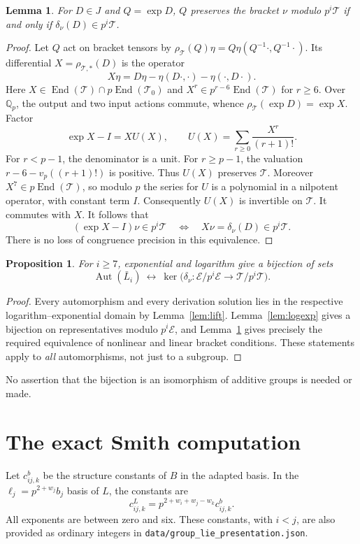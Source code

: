 \documentclass[11pt]{article}
\newtheorem{lemma}[theorem]{Lemma}
\newtheorem{proposition}[theorem]{Proposition}
\theoremstyle{definition}\newtheorem{definition}[theorem]{Definition}
\theoremstyle{remark}\newtheorem{remark}[theorem]{Remark}
\DeclareMathOperator{\Aut}{Aut}
\DeclareMathOperator{\End}{End}
\newcommand{\Qp}{\mathbb Q_p}
\newcommand{\EE}{\mathcal E}
\newcommand{\TT}{\mathcal T}
\begin{document}
\begin{lemma}\label{lem:tensor}
For $D\in J$ and $Q=\exp D$, $Q$ preserves the bracket $\nu$ modulo
$p^i\TT$ if and only if $\delta_\nu(D)\in p^i\TT$.
\end{lemma}
\begin{proof}
Let $Q$ act on bracket tensors by
$\rho_\TT(Q)\eta=Q\eta(Q^{-1}\cdot,Q^{-1}\cdot)$.
Its differential $X=\rho_{\TT,*}(D)$ is the operator
\[
 X\eta=D\eta-\eta(D\cdot,\cdot)-\eta(\cdot,D\cdot).
\]
Here $X\in\End(\TT)\cap p\End(\TT_0)$ and
$X^r\in p^{r-6}\End(\TT)$ for $r\ge6$.
Over $\Qp$, the output and two input actions commute, whence
$\rho_\TT(\exp D)=\exp X$.
Factor
\[
 \exp X-I=XU(X),\qquad
 U(X)=\sum_{r\ge0}\frac{X^r}{(r+1)!}.
\]
For $r<p-1$, the denominator is a unit. For $r\ge p-1$, the valuation
$r-6-v_p((r+1)!)$ is positive. Thus $U(X)$ preserves $\TT$.
Moreover $X^7\in p\End(\TT)$, so modulo $p$ the series for $U$ is a
polynomial in a nilpotent operator, with constant term $I$.
Consequently $U(X)$ is invertible on $\TT$. It commutes with $X$.
It follows that
\[
 (\exp X-I)\nu\in p^i\TT
 \quad\Longleftrightarrow\quad
 X\nu=\delta_\nu(D)\in p^i\TT.
\]
There is no loss of congruence precision in this equivalence.
\end{proof}

\begin{proposition}\label{prop:full-count}
For $i\ge7$, exponential and logarithm give a bijection of sets
\begin{equation}\label{eq:bijection}
 \Aut(\bar L_i)\ \longleftrightarrow\
 \ker\bigl(\delta_\nu:\EE/p^i\EE\longrightarrow\TT/p^i\TT\bigr).
\end{equation}
\end{proposition}
\begin{proof}
Every automorphism and every derivation solution lies in the respective
logarithm--exponential domain by Lemma~\ref{lem:lift}. Lemma~\ref{lem:logexp}
gives a bijection on representatives modulo $p^i\EE$, and
Lemma~\ref{lem:tensor} gives precisely the required equivalence of
nonlinear and linear bracket conditions. These statements apply to
\emph{all} automorphisms, not just to a subgroup.
\end{proof}
No assertion that the bijection is an isomorphism of additive groups is
needed or made.

\section{The exact Smith computation}
Let $c^b_{ij,k}$ be the structure constants of $B$ in the adapted basis.
In the $\ell_j=p^{2+w_j}b_j$ basis of $L$, the constants are
\begin{equation}\label{eq:scaledconstants}
 c^L_{ij,k}=p^{2+w_i+w_j-w_k}c^b_{ij,k}.
\end{equation}
All exponents are between zero and six. These constants, with $i<j$, are
also provided as ordinary integers in
\texttt{data/group\_lie\_presentation.json}.
\end{document}
